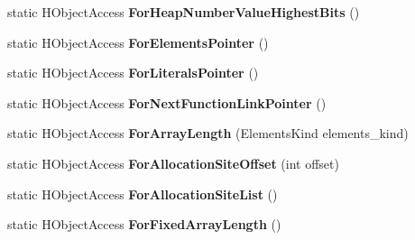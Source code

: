 \begin{DoxyCompactItemize}
\item 
\hypertarget{classv8_1_1internal_1_1_v8___f_i_n_a_l_ac533141089216ebb8fb8cca79d992e9c}{}static H\+Object\+Access {\bfseries For\+Heap\+Number\+Value\+Highest\+Bits} ()\label{classv8_1_1internal_1_1_v8___f_i_n_a_l_ac533141089216ebb8fb8cca79d992e9c}

\item 
\hypertarget{classv8_1_1internal_1_1_v8___f_i_n_a_l_a6838f20b3fd32a71e504a91363e6d900}{}static H\+Object\+Access {\bfseries For\+Elements\+Pointer} ()\label{classv8_1_1internal_1_1_v8___f_i_n_a_l_a6838f20b3fd32a71e504a91363e6d900}

\item 
\hypertarget{classv8_1_1internal_1_1_v8___f_i_n_a_l_a7e197552d653eaa937731bd634a1e11e}{}static H\+Object\+Access {\bfseries For\+Literals\+Pointer} ()\label{classv8_1_1internal_1_1_v8___f_i_n_a_l_a7e197552d653eaa937731bd634a1e11e}

\item 
\hypertarget{classv8_1_1internal_1_1_v8___f_i_n_a_l_aaebae3f62ff19ce4eb3f5371a5312571}{}static H\+Object\+Access {\bfseries For\+Next\+Function\+Link\+Pointer} ()\label{classv8_1_1internal_1_1_v8___f_i_n_a_l_aaebae3f62ff19ce4eb3f5371a5312571}

\item 
\hypertarget{classv8_1_1internal_1_1_v8___f_i_n_a_l_ade0339674880d8dd0d77e28b1fc97b43}{}static H\+Object\+Access {\bfseries For\+Array\+Length} (Elements\+Kind elements\+\_\+kind)\label{classv8_1_1internal_1_1_v8___f_i_n_a_l_ade0339674880d8dd0d77e28b1fc97b43}

\item 
\hypertarget{classv8_1_1internal_1_1_v8___f_i_n_a_l_a217c1716233755e70357f1237cbcfa1d}{}static H\+Object\+Access {\bfseries For\+Allocation\+Site\+Offset} (int offset)\label{classv8_1_1internal_1_1_v8___f_i_n_a_l_a217c1716233755e70357f1237cbcfa1d}

\item 
\hypertarget{classv8_1_1internal_1_1_v8___f_i_n_a_l_a7dfc6bf48731ef786b62ea0b343d06b2}{}static H\+Object\+Access {\bfseries For\+Allocation\+Site\+List} ()\label{classv8_1_1internal_1_1_v8___f_i_n_a_l_a7dfc6bf48731ef786b62ea0b343d06b2}

\item 
\hypertarget{classv8_1_1internal_1_1_v8___f_i_n_a_l_a87b0a8fa0038a3c09e05e84f86d881ca}{}static H\+Object\+Access {\bfseries For\+Fixed\+Array\+Length} ()\label{classv8_1_1internal_1_1_v8___f_i_n_a_l_a87b0a8fa0038a3c09e05e84f86d881ca}


\end{DoxyCompactItemize}
